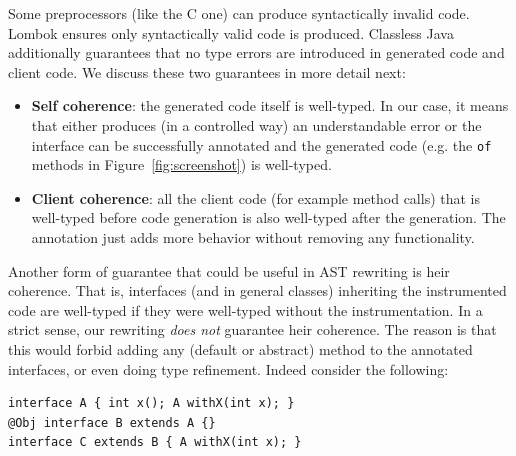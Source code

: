 


Some preprocessors (like the C one) can produce syntactically invalid code.
Lombok ensures only syntactically valid code is produced. %
Classless Java additionally guarantees that no type errors are introduced
in generated code and client code. We discuss these two guarantees in
more detail next:

\begin{itemize}

\item{\bf Self coherence}: the generated code itself is well-typed.
In our case, it means that either \mixin{} produces (in a controlled way) an
understandable error or the interface can be successfully annotated and the generated code
 (e.g. the \texttt{of} methods in Figure~\ref{fig:screenshot}) is well-typed.

\item{\bf Client coherence}: all the client code (for example method calls)
  that is well-typed before code generation is also well-typed after the generation.
The annotation just adds more behavior without removing any functionality.

\end{itemize}

 Another form of guarantee that could be
useful in AST rewriting is heir coherence. That is, interfaces
(and in general classes) inheriting the instrumented code are
well-typed if they were well-typed without the instrumentation.
In a strict sense, our rewriting \emph{does not} guarantee heir coherence.  The reason
is that this would forbid adding any (default or abstract) method to
the annotated interfaces, or even doing type refinement. Indeed consider
the following:

\begin{lstlisting}
interface A { int x(); A withX(int x); }
@Obj interface B extends A {}
interface C extends B { A withX(int x); }
\end{lstlisting}

